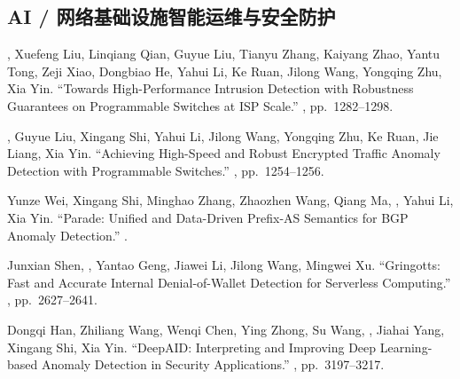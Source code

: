 \documentclass[11pt]{article}
\begin{document}
\subsection*{AI / 网络基础设施智能运维与安全防护}
\begin{publist}[resume]

\item {}, Xuefeng Liu, Linqiang Qian, Guyue Liu, Tianyu Zhang, Kaiyang
Zhao, Yantu Tong, Zeji Xiao, Dongbiao He, Yahui Li, Ke Ruan, Jilong Wang, Yongqing
Zhu, Xia Yin. ``Towards High-Performance Intrusion Detection with Robustness
Guarantees on Programmable Switches at ISP Scale.'' ,
pp.~1282--1298.

\item {}, Guyue Liu\corr, Xingang Shi, Yahui Li, Jilong Wang, Yongqing
Zhu, Ke Ruan, Jie Liang, Xia Yin. ``Achieving High-Speed and Robust Encrypted Traffic
Anomaly Detection with Programmable Switches.'' ,
pp.~1254--1256.

\item Yunze Wei, Xingang Shi, Minghao Zhang, Zhaozhen Wang, Qiang Ma, ,
Yahui Li, Xia Yin. ``Parade: Unified and Data-Driven Prefix-AS Semantics for BGP
Anomaly Detection.'' .

\item Junxian Shen, \corr, Yantao Geng, Jiawei Li, Jilong Wang, Mingwei
Xu. ``Gringotts: Fast and Accurate Internal Denial-of-Wallet Detection for Serverless
Computing.'' , pp.~2627--2641.

\item Dongqi Han, Zhiliang Wang\corr, Wenqi Chen, Ying Zhong, Su Wang, ,
Jiahai Yang, Xingang Shi, Xia Yin. ``DeepAID: Interpreting and Improving Deep
Learning-based Anomaly Detection in Security Applications.'' ,
pp.~3197--3217.


\end{publist}
\end{document}
